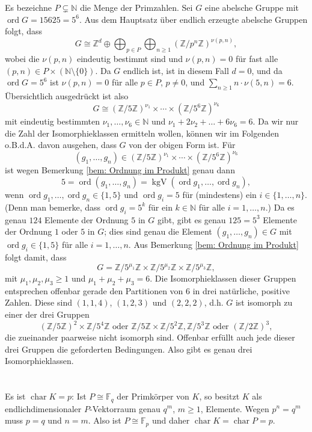 \documentclass[a4paper,10pt]{article}
\theoremstyle{definition}
\newcommand{\N}{\mathbb{N}}
\newcommand{\Z}{\mathbb{Z}}
\newcommand{\F}{\mathbb{F}}
\newcommand{\ord}{\operatorname{ord}}
\newcommand{\kchar}{\operatorname{char}}
\newcommand{\kgV}{\operatorname{kgV}}
\begin{document}
Es bezeichne $P \subsetneq \N$ die Menge der Primzahlen.
Sei $G$ eine abelsche Gruppe mit $\ord G = 15625 = 5^6$. Aus dem Hauptsatz über endlich erzeugte abelsche Gruppen folgt, dass
\[
 G \cong \Z^d \oplus \bigoplus_{p \in P} \bigoplus_{n \geq 1} (\Z/p^n\Z)^{\nu(p,n)},
\]
wobei die $\nu(p,n)$ eindeutig bestimmt sind und $\nu(p,n) = 0$ für fast alle $(p,n) \in P \times (\N\setminus\{0\})$. Da $G$ endlich ist, ist in diesem Fall $d = 0$, und da $\ord G = 5^6$ ist $\nu(p,n) = 0$ für alle $p \in P$, $p \neq 0$, und $\sum_{n \geq 1} n \cdot \nu(5,n) = 6$. Übersichtlich ausgedrückt ist also
\[
 G \cong (\Z/5\Z)^{\nu_1} \times \cdots \times (\Z/5^6\Z)^{\nu_6}
\]
mit eindeutig bestimmten $\nu_1, \ldots, \nu_6 \in \N$ und $\nu_1 + 2 \nu_2 + \ldots + 6 \nu_6 = 6$. Da wir nur die Zahl der Isomorphieklassen ermitteln wollen, können wir im Folgenden o.B.d.A. davon ausgehen, dass $G$ von der obigen Form ist. Für
\[
 (g_1, \ldots, g_n) \in (\Z/5\Z)^{\nu_1} \times \cdots \times (\Z/5^6\Z)^{\nu_6}
\]
ist wegen Bemerkung \ref{bem: Ordnung im Produkt} genau dann
\[
 5 = \ord (g_1, \ldots, g_n) = \kgV(\ord g_1, \ldots, \ord g_n),
\]
wenn $\ord g_1, \ldots, \ord g_n \in \{1,5\}$ und $\ord g_i = 5$ für (mindestens) ein $i \in \{1, \ldots, n\}$. (Denn man bemerke, dass $\ord g_i = 5^k$ für ein $k \in \N$ für alle $i=1,\ldots,n$.)
Da es genau $124$ Elemente der Ordnung $5$ in $G$ gibt, gibt es genau $125 = 5^3$ Elemente der Ordnung $1$ oder $5$ in $G$; dies sind genau die Element $(g_1, \ldots, g_n) \in G$ mit $\ord g_i \in \{1,5\}$ für alle $i=1,\ldots,n$. Aus Bemerkung \ref{bem: Ordnung im Produkt} folgt damit, dass
\[
 G = \Z/5^{\mu_1}\Z \times \Z/5^{\mu_2}\Z \times \Z/5^{\mu_3}\Z,
\]
mit $\mu_1, \mu_2, \mu_3 \geq 1$ und $\mu_1 + \mu_2 + \mu_3 = 6$. Die Isomorphieklassen dieser Gruppen entsprechen offenbar gerade den Partitionen von $6$ in drei natürliche, positive Zahlen. Diese sind $(1,1,4)$, $(1,2,3)$ und $(2,2,2)$, d.h. $G$ ist isomorph zu einer der drei Gruppen
\[
 (\Z/5\Z)^2 \times \Z/5^4\Z \text{ oder } \Z/5\Z \times \Z/5^2\Z, \Z/5^3\Z \text{ oder } (\Z/2\Z)^3,
\]
die zueinander paarweise nicht isomorph sind. Offenbar erfüllt auch jede dieser drei Gruppen die geforderten Bedingungen. Also gibt es genau drei Isomorphieklassen.





\section{}


\subsection{}
Es ist $\kchar K = p$: Ist $P \cong \F_q$ der Primkörper von $K$, so besitzt $K$ als endlichdimensionaler $P$-Vektorraum genau $q^m$, $m \geq 1$, Elemente. Wegen $p^n = q^m$ muss $p = q$ und $n = m$. Also ist $P \cong \F_p$ und daher $\kchar K = \kchar P = p$.
\end{document}
